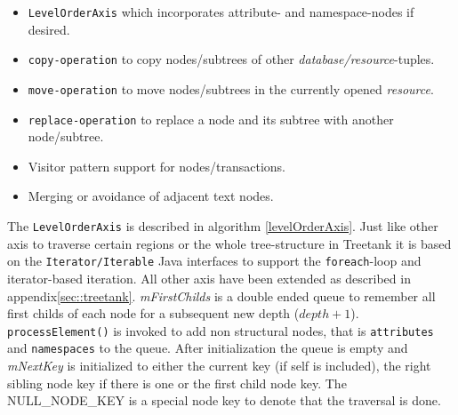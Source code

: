 \begin{itemize}
\item \texttt{LevelOrderAxis} which incorporates attribute- and namespace-nodes if desired.
\item \texttt{copy-operation} to copy nodes/subtrees of other \emph{database/resource}-tuples.
\item \texttt{move-operation} to move nodes/subtrees in the currently opened \emph{resource}.
\item \texttt{replace-operation} to replace a node and its subtree with another node/subtree.
\item Visitor pattern support for nodes/transactions.
\item Merging or avoidance of adjacent text nodes.
\end{itemize}

The \texttt{LevelOrderAxis} is described in algorithm \ref{levelOrderAxis}. Just like other axis to traverse certain regions or the whole tree-structure in Treetank it is based on the \texttt{Iterator/Iterable} Java interfaces to support the \texttt{foreach}-loop and iterator-based iteration. All other axis have been extended as described in appendix\ref{sec::treetank}. \emph{mFirstChilds} is a double ended queue to remember all first childs of each node for a subsequent new depth ($depth + 1$). \texttt{processElement()} is invoked to add non structural nodes, that is \texttt{attributes} and \texttt{namespaces} to the queue. After initialization the queue is empty and \emph{mNextKey} is initialized to either the current key (if self is included), the right sibling node key if there is one or the first child node key. The NULL\_NODE\_KEY is a special node key to denote that the traversal is done.

